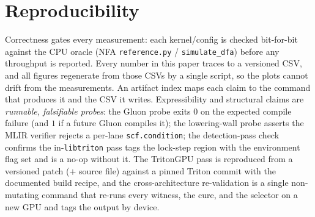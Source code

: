 \documentclass[conference]{IEEEtran}
\begin{document}
\section{Reproducibility}
Correctness gates every measurement: each kernel/config is checked bit-for-bit against the CPU oracle
(NFA \texttt{reference.py} / \texttt{simulate\_dfa}) before any throughput is reported. Every number in
this paper traces to a versioned CSV, and all figures regenerate from those CSVs by a single script, so
the plots cannot drift from the measurements. An artifact index maps each claim to the command that
produces it and the CSV it writes. Expressibility and structural claims are \emph{runnable, falsifiable
probes}: the Gluon probe exits $0$ on the expected compile failure (and $1$ if a future Gluon compiles
it); the lowering-wall probe asserts the MLIR verifier rejects a per-lane \texttt{scf.condition}; the
detection-pass check confirms the in-\texttt{libtriton} pass tags the lock-step region with the
environment flag set and is a no-op without it. The TritonGPU pass is reproduced from a versioned patch
($+$ source file) against a pinned Triton commit with the documented build recipe, and the
cross-architecture re-validation is a single non-mutating command that re-runs every witness, the cure,
and the selector on a new GPU and tags the output by device.
\end{document}
